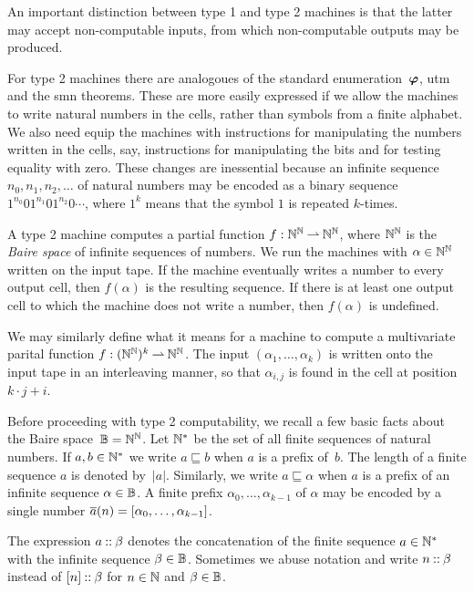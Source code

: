 An important distinction between type 1 and type 2 machines is that
the latter may accept non-computable inputs, from which non-computable
outputs may be produced.

For type 2 machines there are analogoues of the standard
enumeration~$\text{\boldmath{$\varphi$}}$, utm and the smn theorems. These are more easily
expressed if we allow the machines to write natural numbers in the
cells, rather than symbols from a finite alphabet. We also need equip
the machines with instructions for manipulating the numbers written in
the cells, say, instructions for manipulating the bits and for testing
equality with zero. These changes are inessential because an infinite
sequence $n_0, n_1, n_2, \ldots$ of natural numbers may be encoded as
a binary sequence $1^{n_0}01^{n_1}01^{n_2}0\cdots$, where $1^k$ means
that the symbol $1$ is repeated $k$-times.

A type 2 machine computes a partial function $f : \mathbb{N}^{\mathbb{N}} \mathbin{\rightharpoonup}
\mathbb{N}^{\mathbb{N}}$, where $\mathbb{N}^{\mathbb{N}}$ is the \emph{Baire space} of infinite
sequences of numbers. We run the machines with $\alpha \in \mathbb{N}^{\mathbb{N}}$
written on the input tape. If the machine eventually writes a number
to every output cell, then $f(\alpha)$ is the resulting sequence. If
there is at least one output cell to which the machine does not write
a number, then $f(\alpha)$ is undefined.

We may similarly define what it means for a machine to compute a
multivariate parital function $f : (\mathbb{N}^{\mathbb{N}})^k \mathbin{\rightharpoonup} \mathbb{N}^{\mathbb{N}}$. The
input $(\alpha_1, \ldots, \alpha_k)$ is written onto the input tape in
an interleaving manner, so that $\alpha_{i,j}$ is found in the cell at
position $k \cdot j + i$.

Before proceeding with type 2 computability, we recall a few basic
facts about the Baire space~$\mathbb{B} = \mathbb{N}^{\mathbb{N}}$. Let $\mathbb{N}^{*}$ be the
set of all finite sequences of natural numbers. If $a, b \in \mathbb{N}^{*}$
we write $a \sqsubseteq b$ when $a$ is a prefix of~$b$. The length of
a finite sequence $a$ is denoted by~$|a|$. Similarly, we write $a
\sqsubseteq \alpha$ when $a$ is a prefix of an infinite sequence
$\alpha \in \mathbb{B}$. A finite prefix $\alpha_0, \ldots, \alpha_{k-1}$
of $\alpha$ may be encoded by a single number $\overline{a}(n) = [\alpha_0,
\ldots, \alpha_{k-1}]$.

The expression $a \mathbin{{:}{:}} \beta$ denotes the concatenation of the
finite sequence $a \in \mathbb{N}^{*}$ with the infinite sequence $\beta \in
\mathbb{B}$. Sometimes we abuse notation and write $n \mathbin{{:}{:}} \beta$
instead of $[n] \mathbin{{:}{:}} \beta$ for $n \in \mathbb{N}$ and $\beta \in
\mathbb{B}$.

